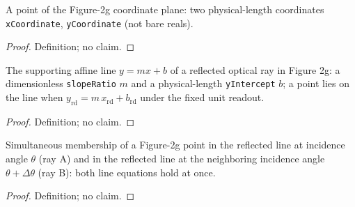 \begin{definition}
\label{def:IPhO2026Problems_problem_IPhO_2026_2_C_3:Figure2gPoint}
A point of the Figure-2g coordinate plane: two physical-length
coordinates \texttt{xCoordinate}, \texttt{yCoordinate} (not bare reals).
\end{definition}
\begin{proof}
Definition; no claim.
\end{proof}

\begin{definition}
\label{def:IPhO2026Problems_problem_IPhO_2026_2_C_3:ReflectedRayLine}
The supporting affine line $y = m x + b$ of a reflected optical ray in
Figure 2g: a dimensionless \texttt{slopeRatio} $m$ and a physical-length
\texttt{yIntercept} $b$; a point lies on the line when
$y_{\mathrm{rd}} = m\,x_{\mathrm{rd}} + b_{\mathrm{rd}}$ under the fixed
unit readout.
\end{definition}
\begin{proof}
Definition; no claim.
\end{proof}

\begin{definition}
\label{def:IPhO2026Problems_problem_IPhO_2026_2_C_3:IsNeighboringReflectedIntersection}
Simultaneous membership of a Figure-2g point in the reflected line at
incidence angle $\theta$ (ray A) and in the reflected line at the
neighboring incidence angle $\theta + \Delta\theta$ (ray B): both line
equations hold at once.
\end{definition}
\begin{proof}
Definition; no claim.
\end{proof}

